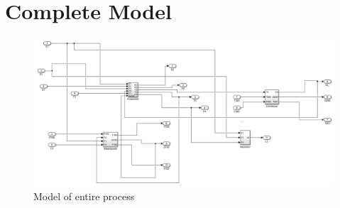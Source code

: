 \documentclass[11pt]{article}
\begin{document}
\section{Complete Model}
\begin{figure}[H]
\centering	\includegraphics[scale = 0.6]
{Process}
\caption{Model of entire process}
\label{process}
\end{figure}
\end{document}
